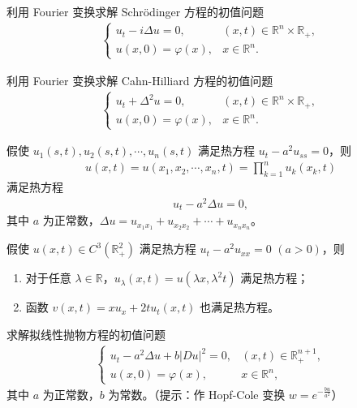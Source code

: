 \documentclass[../../main.tex]{subfiles}%
\begin{document}
\begin{example}
利用 Fourier 变换求解 Schr\"{o}dinger 方程的初值问题
\begin{align*}
\begin{cases}
u_t-i\Delta u=0, & (x,t)\in\mathbb{R}^n\times\mathbb{R}_+,\\
u(x,0)=\varphi(x), & x\in\mathbb{R}^n.
\end{cases}
\end{align*}
\end{example}

\begin{example}
利用 Fourier 变换求解 Cahn-Hilliard 方程的初值问题
\begin{align*}
\begin{cases}
u_t+\Delta^2u=0, & (x,t)\in\mathbb{R}^n\times\mathbb{R}_+,\\
u(x,0)=\varphi(x), & x\in\mathbb{R}^n.
\end{cases}
\end{align*}
\end{example}

\begin{example}
假使 $u_1(s,t),u_2(s,t),\cdots,u_n(s,t)$ 满足热方程 $u_t-a^2u_{ss}=0$，则
\begin{align*}
u(x,t)=u(x_1,x_2,\cdots,x_n,t)=\prod_{k=1}^n u_k(x_k,t)
\end{align*}
满足热方程
\begin{align*}
u_t-a^2\Delta u=0,
\end{align*}
其中 $a$ 为正常数，$\Delta u=u_{x_1x_1}+u_{x_2x_2}+\cdots+u_{x_nx_n}$。
\end{example}

\begin{example}
假使 $u(x,t)\in C^3(\mathbb{R}_+^2)$ 满足热方程 $u_t-a^2u_{xx}=0$ $(a>0)$，则
\begin{enumerate}[(1)]
\item 对于任意 $\lambda\in\mathbb{R}$，$u_\lambda(x,t)=u(\lambda x,\lambda^2t)$ 满足热方程；
\item 函数 $v(x,t)=xu_x+2tu_t(x,t)$ 也满足热方程。
\end{enumerate}
\end{example}

\begin{example}
求解拟线性抛物方程的初值问题
\begin{align*}
\begin{cases}
u_t-a^2\Delta u+b|Du|^2=0, & (x,t)\in\mathbb{R}_+^{n+1},\\
u(x,0)=\varphi(x), & x\in\mathbb{R}^n,
\end{cases}
\end{align*}
其中 $a$ 为正常数，$b$ 为常数。（提示：作 Hopf-Cole 变换 $w=e^{-\frac{bu}{a^2}}$）
\end{example}
\end{document}
